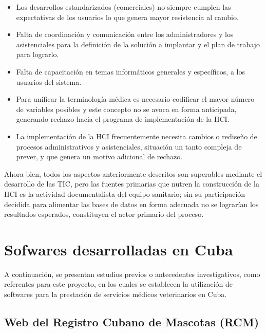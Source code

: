 \begin{itemize}
	\item	Los desarrollos estandarizados (comerciales) no siempre cumplen las expectativas de los usuarios lo que genera mayor resistencia al cambio.  
	
	\item Falta de coordinación y comunicación entre los administradores y los asistenciales para la definición de la solución a implantar y el plan de trabajo para lograrlo.  
	
	\item Falta de capacitación en temas informáticos generales y específicos, a los usuarios del sistema. 
	
	\item Para unificar la terminología médica es necesario codificar el mayor número de variables posibles y este concepto no se avoca en forma anticipada, generando rechazo hacia el programa de implementación de la HCI. 
	
	\item La implementación de la HCI frecuentemente necesita cambios o rediseño de procesos administrativos y asistenciales, situación un tanto compleja de prever, y que genera un motivo adicional de rechazo.  
\end{itemize}



Ahora bien, todos los aspectos anteriormente descritos son superables mediante el desarrollo de las TIC, pero las fuentes primarias que nutren la construcción de la HCI es la actividad documentalista del equipo sanitario; sin su participación decidida para alimentar las bases de datos en forma adecuada no se lograrían los resultados esperados, constituyen el actor primario del proceso.





\section{Sofwares desarrolladas en Cuba}
A continuación, se presentan estudios previos o antecedentes investigativos, como referentes para este proyecto, en los cuales se establecen la utilización de softwares para la prestación de servicios médicos veterinarios en Cuba. 

\subsection{Web del Registro Cubano de Mascotas (RCM)}\label{chapter:introduction}



